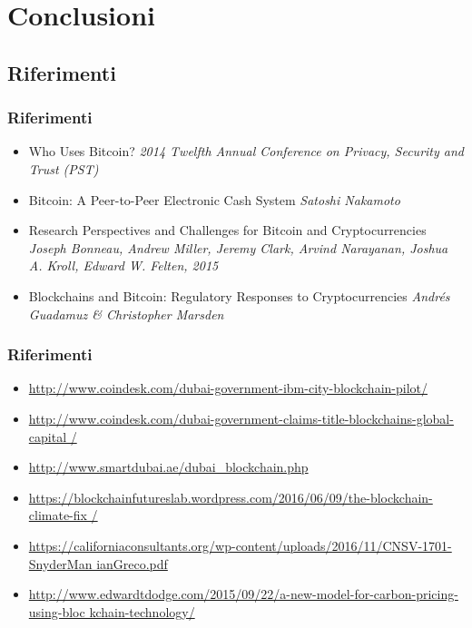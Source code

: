 \section*{Conclusioni}
\subsection*{Riferimenti}
\begin{frame}
  \frametitle{Riferimenti}

  \begin{itemize}
   \item Who Uses Bitcoin? \emph{2014 Twelfth Annual Conference on Privacy, 
Security and Trust (PST)}
   \item Bitcoin: A Peer-to-Peer Electronic Cash System \emph{Satoshi Nakamoto}
   \item Research Perspectives and Challenges for Bitcoin and Cryptocurrencies 
\emph{Joseph Bonneau, Andrew Miller, Jeremy Clark, Arvind Narayanan, Joshua A. 
Kroll, Edward W. Felten, 2015}
   \item Blockchains and Bitcoin: Regulatory Responses to Cryptocurrencies 
\emph{Andrés Guadamuz & Christopher Marsden}
  \end{itemize}

\end{frame}


\begin{frame}
  \frametitle{Riferimenti}

  \begin{itemize}
   \item
\url{http://www.coindesk.com/dubai-government-ibm-city-blockchain-pilot/}
\item
\url{
http://www.coindesk.com/dubai-government-claims-title-blockchains-global-capital
/}
\item \url{http://www.smartdubai.ae/dubai_blockchain.php}
\item
\url{
https://blockchainfutureslab.wordpress.com/2016/06/09/the-blockchain-climate-fix
/}
\item
\url{
https://californiaconsultants.org/wp-content/uploads/2016/11/CNSV-1701-SnyderMan
ianGreco.pdf}
\item
\url{
http://www.edwardtdodge.com/2015/09/22/a-new-model-for-carbon-pricing-using-bloc
kchain-technology/}
  \end{itemize}

\end{frame}
